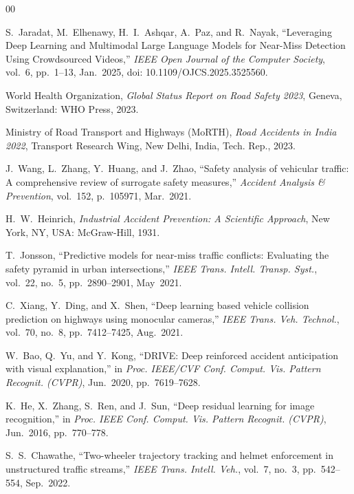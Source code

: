 \documentclass[journal,compsoc]{IEEEtran}
\begin{document}
\begin{thebibliography}{00}

S.~Jaradat, M.~Elhenawy, H.~I.~Ashqar, A.~Paz, and R.~Nayak, ``Leveraging Deep Learning and Multimodal Large Language Models for Near-Miss Detection Using Crowdsourced Videos,'' \textit{IEEE Open Journal of the Computer Society}, vol.~6, pp.~1--13, Jan.~2025, doi: 10.1109/OJCS.2025.3525560.

World Health Organization, \textit{Global Status Report on Road Safety 2023}, Geneva, Switzerland: WHO Press, 2023.

Ministry of Road Transport and Highways (MoRTH), \textit{Road Accidents in India 2022}, Transport Research Wing, New Delhi, India, Tech. Rep., 2023.

J.~Wang, L.~Zhang, Y.~Huang, and J.~Zhao, ``Safety analysis of vehicular traffic: A comprehensive review of surrogate safety measures,'' \textit{Accident Analysis \& Prevention}, vol.~152, p.~105971, Mar.~2021.

H.~W.~Heinrich, \textit{Industrial Accident Prevention: A Scientific Approach}, New York, NY, USA: McGraw-Hill, 1931.

T.~Jonsson, ``Predictive models for near-miss traffic conflicts: Evaluating the safety pyramid in urban intersections,'' \textit{IEEE Trans. Intell. Transp. Syst.}, vol.~22, no.~5, pp.~2890--2901, May~2021.

C.~Xiang, Y.~Ding, and X.~Shen, ``Deep learning based vehicle collision prediction on highways using monocular cameras,'' \textit{IEEE Trans. Veh. Technol.}, vol.~70, no.~8, pp.~7412--7425, Aug.~2021.

W.~Bao, Q.~Yu, and Y.~Kong, ``DRIVE: Deep reinforced accident anticipation with visual explanation,'' in \textit{Proc. IEEE/CVF Conf. Comput. Vis. Pattern Recognit. (CVPR)}, Jun.~2020, pp.~7619--7628.

K.~He, X.~Zhang, S.~Ren, and J.~Sun, ``Deep residual learning for image recognition,'' in \textit{Proc. IEEE Conf. Comput. Vis. Pattern Recognit. (CVPR)}, Jun.~2016, pp.~770--778.

S.~S.~Chawathe, ``Two-wheeler trajectory tracking and helmet enforcement in unstructured traffic streams,'' \textit{IEEE Trans. Intell. Veh.}, vol.~7, no.~3, pp.~542--554, Sep.~2022.


\end{thebibliography}
\end{document}
